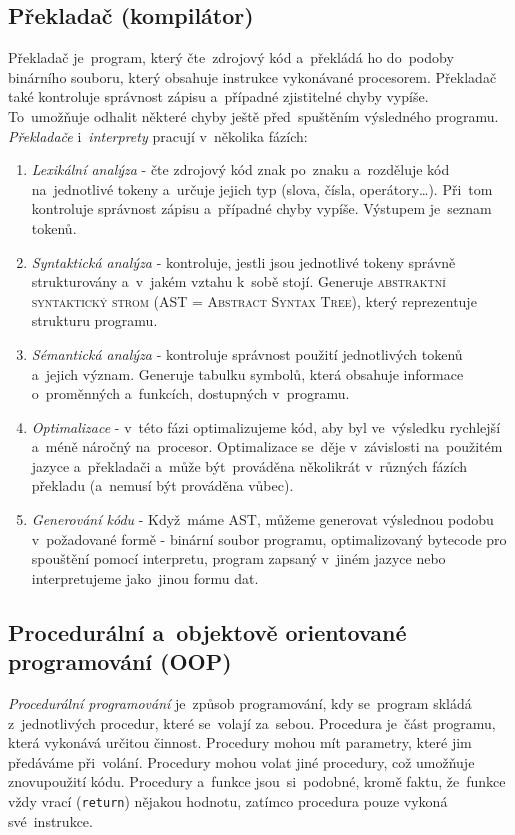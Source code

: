 \documentclass[14pt,a4paper]{article}
\begin{document}
        \subsection{Překladač (kompilátor)}
        Překladač je~program, který čte~zdrojový kód a~překládá ho do~podoby binárního souboru, který obsahuje instrukce vykonávané procesorem. Překladač také kontroluje správnost zápisu a~případné zjistitelné chyby vypíše. To~umožňuje odhalit některé chyby ještě před~spuštěním výsledného programu.
        \emph{Překladače} i~\emph{interprety} pracují v~několika fázích:
        \begin{enumerate}
            \item \emph{Lexikální analýza} - čte zdrojový kód znak po~znaku a~rozděluje kód na~jednotlivé tokeny a~určuje jejich typ (slova, čísla, operátory\dots). Při~tom kontroluje správnost zápisu a~případné chyby vypíše. Výstupem je~seznam tokenů.
            \item \emph{Syntaktická analýza} - kontroluje, jestli jsou jednotlivé tokeny správně strukturovány a~v~jakém vztahu k~sobě stojí. Generuje \textsc{abstraktní syntaktický strom (AST = Abstract Syntax Tree)}, který reprezentuje strukturu programu.
            \item \emph{Sémantická analýza} - kontroluje správnost použití jednotlivých tokenů a~jejich význam. Generuje tabulku symbolů, která obsahuje informace o~proměnných a~funkcích, dostupných v~programu.
            \item \emph{Optimalizace} - v~této fázi optimalizujeme kód, aby byl ve~výsledku rychlejší a~méně náročný na~procesor. Optimalizace se~děje v~závislosti na~použitém jazyce a~překladači a~může být~prováděna několikrát v~různých fázích překladu (a~nemusí být prováděna vůbec).
            \item \emph{Generování kódu} - Když~máme \textsc{AST}, můžeme generovat výslednou podobu v~požadované formě - binární soubor programu, optimalizovaný bytecode pro spouštění pomocí interpretu, program zapsaný v~jiném jazyce nebo interpretujeme jako~jinou formu dat.
        \end{enumerate} \cite{baeldungCompilersWork}

        \subsection{Procedurální a~objektově orientované programování (OOP)}
        \emph{Procedurální programování} je~způsob programování, kdy se~program skládá z~jednotlivých procedur, které se~volají za~sebou. Procedura je~část programu, která vykonává určitou činnost. Procedury mohou mít parametry, které jim předáváme při~volání. Procedury mohou volat jiné procedury, což umožňuje znovupoužití kódu. Procedury a~funkce jsou~si~podobné, kromě faktu, že~funkce vždy vrací (\texttt{return}) nějakou hodnotu, zatímco procedura pouze vykoná své~instrukce.
        
\end{document}
